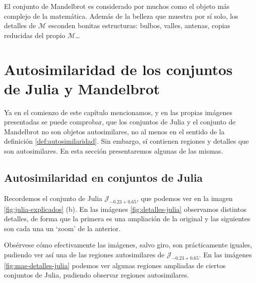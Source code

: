 El conjunto de Mandelbrot es considerado por muchos como el objeto más complejo de la matemática. Además de la belleza que muestra por sí solo, los detalles de $\mathcal{M}$ esconden bonitas estructuras: bulbos, valles, antenas, copias reducidas del propio $\mathcal{M}$\dots

\section{Autosimilaridad de los conjuntos de Julia y Mandelbrot}
\label{section:autosimilaridad-julia-mandelbrot}

Ya en el comienzo de este capítulo mencionamos, y en las propias imágenes presentadas se puede comprobar, que los conjuntos de Julia y el conjunto de Mandelbrot no son objetos autosimilares, no al menos en el sentido de la definición \ref{def:autosimilaridad}. Sin embargo, sí contienen regiones y detalles que son autosimilares. En esta sección presentaremos algunas de las mismas.

\subsection{Autosimilaridad en conjuntos de Julia}

Recordemos el conjunto de Julia $\mathcal{J}_{-0.23+0.65}$, que podemos ver en la imagen \ref{fig:julia-explicados} (b). En las imágenes \ref{fig:detalles-julia} observamos distintos detalles, de forma que la primera es una ampliación de la original y las siguientes son cada una un `zoom' de la anterior.

Obsérvese cómo efectivamente las imágenes, salvo giro, son prácticamente iguales, pudiendo ver así una de las regiones autosimilares de $\mathcal{J}_{-0.23+0.65}$. En las imágenes \ref{fig:mas-detalles-julia} podemos ver algunas regiones ampliadas de ciertos conjuntos de Julia, pudiendo observar regiones autosimilares.

\newpage

